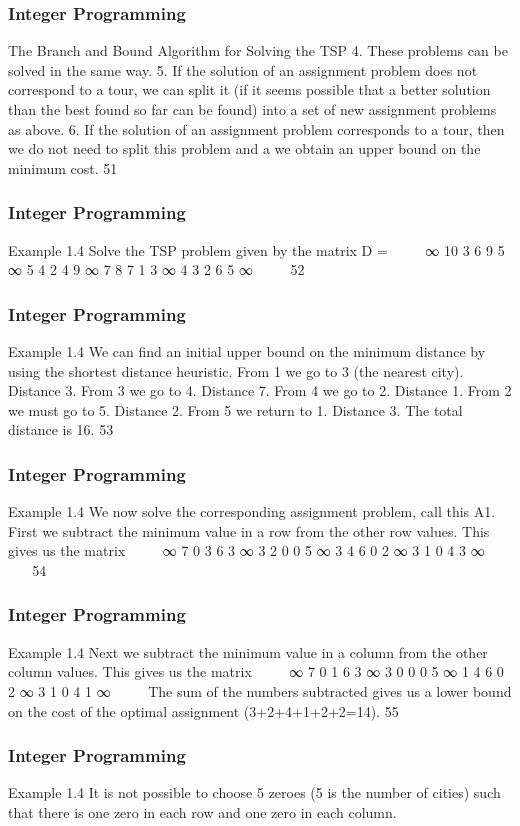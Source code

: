 \begin{frame}
\frametitle{Integer Programming}     
The Branch and Bound Algorithm for Solving the TSP
4. These problems can be solved in the same way.
5. If the solution of an assignment problem does not
correspond to a tour, we can split it (if it seems
possible that a better solution than the best found so
far can be found) into a set of new assignment
problems as above.
6. If the solution of an assignment problem corresponds
to a tour, then we do not need to split this problem
and a we obtain an upper bound on the minimum
cost.
51 
\end{frame}  
\begin{frame}
\frametitle{Integer Programming}     
Example 1.4
Solve the TSP problem given by the matrix
D =


∞ 10 3 6 9
5 ∞ 5 4 2
4 9 ∞ 7 8
7 1 3 ∞ 4
3 2 6 5 ∞


52 \end{frame}  \begin{frame} \frametitle{Integer Programming}     
Example 1.4
We can find an initial upper bound on the minimum distance by
using the shortest distance heuristic.
From 1 we go to 3 (the nearest city). Distance 3. From 3 we go to
4. Distance 7.
From 4 we go to 2. Distance 1. From 2 we must go to 5. Distance
2.
From 5 we return to 1. Distance 3. The total distance is 16.
53 \end{frame}  \begin{frame} \frametitle{Integer Programming}     
Example 1.4
We now solve the corresponding assignment problem, call this A1.
First we subtract the minimum value in a row from the other row
values. This gives us the matrix


∞ 7 0 3 6
3 ∞ 3 2 0
0 5 ∞ 3 4
6 0 2 ∞ 3
1 0 4 3 ∞


54 \end{frame}  \begin{frame} \frametitle{Integer Programming}     
Example 1.4
Next we subtract the minimum value in a column from the other
column values. This gives us the matrix


∞ 7 0 1 6
3 ∞ 3 0 0
0 5 ∞ 1 4
6 0 2 ∞ 3
1 0 4 1 ∞


The sum of the numbers subtracted gives us a lower bound on the
cost of the optimal assignment (3+2+4+1+2+2=14).
55 \end{frame}  \begin{frame} \frametitle{Integer Programming}     
Example 1.4
It is not possible to choose 5 zeroes (5 is the number of cities) such
that there is one zero in each row and one zero in each column.

\end{frame}
